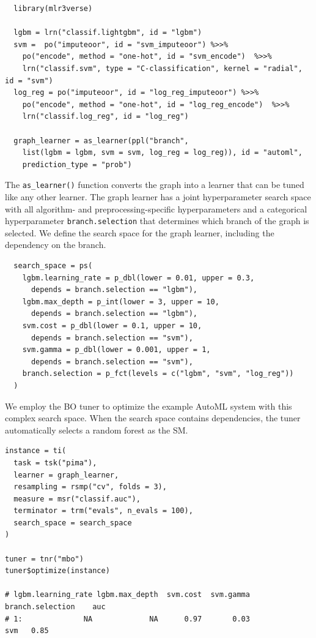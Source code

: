 \documentclass[12pt,letterpaper]{article}
\begin{document}
\begin{verbatim}
  library(mlr3verse)
  
  lgbm = lrn("classif.lightgbm", id = "lgbm")
  svm =  po("imputeoor", id = "svm_imputeoor") %>>% 
    po("encode", method = "one-hot", id = "svm_encode")  %>>% 
    lrn("classif.svm", type = "C-classification", kernel = "radial", id = "svm")
  log_reg = po("imputeoor", id = "log_reg_imputeoor") %>>%
    po("encode", method = "one-hot", id = "log_reg_encode")  %>>%
    lrn("classif.log_reg", id = "log_reg")

  graph_learner = as_learner(ppl("branch",
    list(lgbm = lgbm, svm = svm, log_reg = log_reg)), id = "automl",
    prediction_type = "prob")
 \end{verbatim}

The \texttt{as\_learner()} function converts the graph into a learner that can be tuned like any other learner.
The graph learner has a joint hyperparameter search space with all algorithm- and preprocessing-specific hyperparameters and a categorical hyperparameter \texttt{branch.selection} that determines which branch of the graph is selected.
We define the search space for the graph learner, including the dependency on the branch.

\begin{verbatim}
  search_space = ps(
    lgbm.learning_rate = p_dbl(lower = 0.01, upper = 0.3,
      depends = branch.selection == "lgbm"),
    lgbm.max_depth = p_int(lower = 3, upper = 10,
      depends = branch.selection == "lgbm"),
    svm.cost = p_dbl(lower = 0.1, upper = 10,
      depends = branch.selection == "svm"),
    svm.gamma = p_dbl(lower = 0.001, upper = 1,
      depends = branch.selection == "svm"),
    branch.selection = p_fct(levels = c("lgbm", "svm", "log_reg"))
  )
\end{verbatim}

We employ the BO tuner to optimize the example AutoML system with this complex search space.
When the search space contains dependencies, the tuner automatically selects a random forest as the SM.
  
\begin{verbatim}
instance = ti(
  task = tsk("pima"),
  learner = graph_learner,
  resampling = rsmp("cv", folds = 3),
  measure = msr("classif.auc"),
  terminator = trm("evals", n_evals = 100),
  search_space = search_space
)

tuner = tnr("mbo")
tuner$optimize(instance)

# lgbm.learning_rate lgbm.max_depth  svm.cost  svm.gamma branch.selection    auc
# 1:              NA             NA      0.97       0.03              svm   0.85
\end{verbatim}
\end{document}
